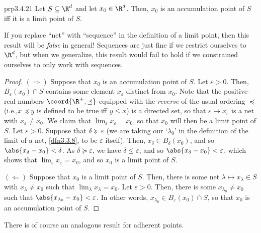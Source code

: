 \begin{prp}{}{prp3.4.21}
Let $S\subseteq \R ^d$ and let $x_0\in \R ^d$.  Then, $x_0$ is an accumulation point of $S$ iff it is a limit point of $S$.
\begin{rmk}
If you replace ``net'' with ``sequence'' in the definition of a limit point, then this result will be \emph{false} in general!  Sequences are just fine if we restrict ourselves to $\R ^d$, but when we generalize, this result would fail to hold if we constrained ourselves to only work with sequences.
\end{rmk}
\begin{proof}
$(\Rightarrow )$ Suppose that $x_0$ is an accumulation point of $S$.  Let $\varepsilon >0$.  Then, $B_\varepsilon (x_0)\cap S$ contains some element $x_\varepsilon$ distinct from $x_0$.  Note that the positive-real numbers $\coord{\R ^+,\preceq}$ equipped with the \emph{reverse} of the usual ordering $\preceq$ (i.e.,$x\preceq y$ is defined to be true iff $y\leq x$) is a directed set, so that $\varepsilon \mapsto x_\varepsilon$ is a net with $x_\varepsilon \neq x_0$.  We claim that $\lim _\varepsilon x_\varepsilon =x_0$, so that $x_0$ will then be a limit point of $S$.  Let $\varepsilon >0$.  Suppose that $\delta \succeq \varepsilon$ (we are taking our `$\lambda _0$' in the definition of the limit of a net, \cref{dfn3.3.8}, to be $\varepsilon$ itself).  Then, $x_\delta \in B_\delta (x_0)$, and so $\abs{x_\delta -x_0}<\delta$.  As $\delta \succeq \varepsilon$, we have $\delta \leq \varepsilon$, and so $\abs{x_\delta -x_0}<\varepsilon$, which shows that $\lim _\varepsilon x_\varepsilon =x_0$, and so $x_0$ is a limit point of $S$.

\blankline
\noindent
$(\Leftarrow )$ Suppose that $x_0$ is a limit point of $S$.  Then, there is some net $\lambda \mapsto x_\lambda \in S$ with $x_\lambda \neq x_0$ such that $\lim _\lambda x_\lambda =x_0$.  Let $\varepsilon >0$.  Then, there is some $x_{\lambda _0}\neq x_0$ such that $\abs{x_{\lambda _0}-x_0}<\varepsilon$.  In other words, $x_{\lambda _0}\in B_\varepsilon (x_0)\cap S$, so that $x_0$ is an accumulation point of $S$.
\end{proof}
\end{prp}
There is of course an analogous result for adherent points.
